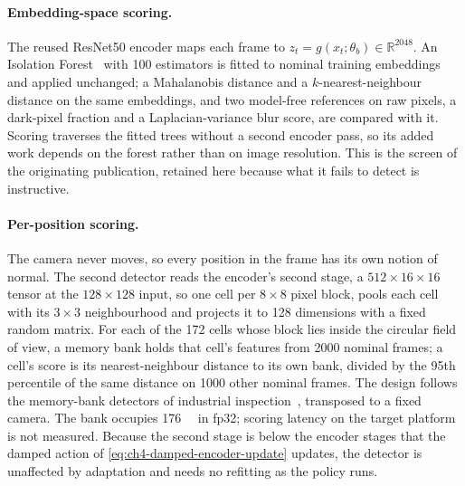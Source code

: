 \paragraph{Embedding-space scoring.} The reused ResNet50 encoder maps each frame to $z_t = g(x_t;\theta_b) \in \mathbb{R}^{\num{2048}}$. An Isolation Forest~\cite{articleLiu2012} with 100 estimators is fitted to nominal training embeddings and applied unchanged; a Mahalanobis distance and a $k$-nearest-neighbour distance on the same embeddings, and two model-free references on raw pixels, a dark-pixel fraction and a Laplacian-variance blur score, are compared with it. Scoring traverses the fitted trees without a second encoder pass, so its added work depends on the forest rather than on image resolution. This is the screen of the originating publication, retained here because what it fails to detect is instructive.

\paragraph{Per-position scoring.} The camera never moves, so every position in the frame has its own notion of normal. The second detector reads the encoder's second stage, a $512 \times 16 \times 16$ tensor at the $128 \times 128$ input, so one cell per $8 \times 8$ pixel block, pools each cell with its $3 \times 3$ neighbourhood and projects it to 128 dimensions with a fixed random matrix. For each of the 172 cells whose block lies inside the circular field of view, a memory bank holds that cell's features from \num{2000} nominal frames; a cell's score is its nearest-neighbour distance to its own bank, divided by the 95th percentile of the same distance on \num{1000} other nominal frames. The design follows the memory-bank detectors of industrial inspection~\cite{roth2022towards}, transposed to a fixed camera. The bank occupies \SI{176}{\mega\byte} in \gls{fp32}; scoring latency on the target platform is not measured. Because the second stage is below the encoder stages that the damped action of \cref{eq:ch4-damped-encoder-update} updates, the detector is unaffected by adaptation and needs no refitting as the policy runs.

